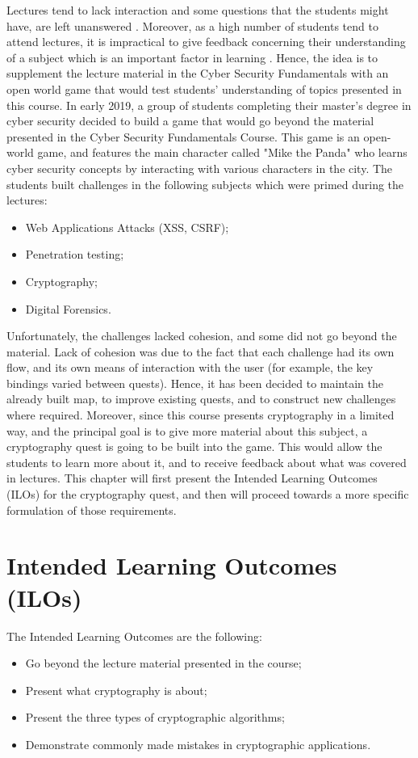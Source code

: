 \documentclass{l4proj}
\begin{document}
Lectures tend to lack interaction and some questions that the students might have, are left unanswered \citep{lehmann_theory-driven_2014}.
Moreover, as a high number of students tend to attend lectures, it is impractical to give feedback concerning their understanding of a subject 
which is an important factor in learning \citep{lehmann_theory-driven_2014}.
Hence, the idea is to supplement the lecture material in the Cyber Security Fundamentals with an open world game that would test students' understanding
of topics presented in this course.
In early 2019, a group of students completing their master's degree in cyber security decided to build a game that would go
beyond the material presented in the Cyber Security Fundamentals Course.
This game is an open-world game, and features the main character called "Mike the Panda" who learns cyber security concepts by
interacting with various characters in the city. 
The students built challenges in the following subjects which were primed during the lectures:
\begin{itemize}
    \item Web Applications Attacks (XSS, CSRF);
    \item Penetration testing;
    \item Cryptography;
    \item Digital Forensics.
\end{itemize}
Unfortunately, the challenges lacked cohesion, and some did not go beyond the material.
Lack of cohesion was due to the fact that each challenge had its own flow, and its own means of interaction with the user 
(for example, the key bindings varied between quests). 
Hence, it has been decided to maintain the already built map, to improve existing quests, and to construct new challenges where required.
Moreover, since this course presents cryptography in a limited way, and the principal goal is to give more material about this subject,
a cryptography quest is going to be built into the game. This would allow the students to learn more about it, 
and to receive feedback about what was covered in lectures.
This chapter will first present the Intended Learning Outcomes (ILOs) for the cryptography quest, and then will proceed towards a more specific 
formulation of those requirements.

\section{Intended Learning Outcomes (ILOs)}

The Intended Learning Outcomes are the following:
\begin{itemize}
    \item Go beyond the lecture material presented in the course;
    \item Present what cryptography is about;
    \item Present the three types of cryptographic algorithms;
    \item Demonstrate commonly made mistakes in cryptographic applications.
\end{itemize}
\end{document}
